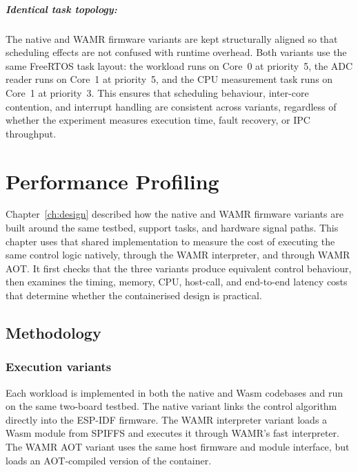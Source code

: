 \documentclass[12pt, a4paper]{report}
\begin{document}
\paragraph{Identical task topology:} The native and WAMR firmware variants are kept structurally aligned so that scheduling effects are not confused with runtime overhead. Both variants use the same FreeRTOS task layout: the workload runs on Core~0 at priority~5, the ADC reader runs on Core~1 at priority~5, and the CPU measurement task runs on Core~1 at priority~3. This ensures that scheduling behaviour, inter-core contention, and interrupt handling are consistent across variants, regardless of whether the experiment measures execution time, fault recovery, or IPC throughput.


\chapter{Performance Profiling}
\label{ch:performance_profiling}
\label{ch:evaluation}
\label{ch:wamr}

Chapter~\ref{ch:design} described how the native and WAMR firmware variants are built around the same testbed, support tasks, and hardware signal paths. This chapter uses that shared implementation to measure the cost of executing the same control logic natively, through the WAMR interpreter, and through WAMR AOT. It first checks that the three variants produce equivalent control behaviour, then examines the timing, memory, CPU, host-call, and end-to-end latency costs that determine whether the containerised design is practical.


\section{Methodology}
\label{sec:perf-methodology}

\subsection{Execution variants}
\label{subsec:perf-execution-variants}

Each workload is implemented in both the native and Wasm codebases and run on the same two-board testbed. The native variant links the control algorithm directly into the ESP-IDF firmware. The WAMR interpreter variant loads a Wasm module from SPIFFS and executes it through WAMR's fast interpreter. The WAMR AOT variant uses the same host firmware and module interface, but loads an AOT-compiled version of the container.
\end{document}
